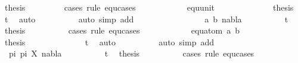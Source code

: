 \begin{isabellebody}
\ {\isacharquery}{\kern0pt}thesis\isanewline
\ \ \ \ \ \ \ \ \isamarkupfalse%
{\isacharparenleft}{\kern0pt}cases\ rule{\isacharcolon}{\kern0pt}\ equ{\isachardot}{\kern0pt}cases{\isacharparenright}{\kern0pt}\isanewline
\ \ \ \ \ \ \ \ \ \ \isamarkupfalse%
\ equ{\isacharunderscore}{\kern0pt}unit\isanewline
\ \ \ \ \ \ \ \ \ \ \isamarkupfalse%
\ \isamarkupfalse%
\ {\isacharquery}{\kern0pt}thesis\ \isamarkupfalse%
\ t{}{}\ \isamarkupfalse%
\ auto\isanewline
\ \ \ \ \ \ \ \ \isamarkupfalse%
\ {\isacharparenleft}{\kern0pt}auto\ simp\ add{\isacharcolon}{\kern0pt}\ {}{\isacharparenright}{\kern0pt}\isanewline
\ \ \ \ \ \isamarkupfalse%
\isanewline
\ \ \ \ \ \ \ \isamarkupfalse%
\ {\isacharparenleft}{\kern0pt}{}\ a\ b\ nabla{\isacharparenright}{\kern0pt}\isanewline
\ \ \ \ \ \ \ \ \isamarkupfalse%
\ t{}{}\ \isamarkupfalse%
\ {\isacharquery}{\kern0pt}thesis\ \isanewline
\ \ \ \ \ \ \ \ \isamarkupfalse%
{\isacharparenleft}{\kern0pt}cases\ rule{\isacharcolon}{\kern0pt}\ equ{\isachardot}{\kern0pt}cases{\isacharparenright}{\kern0pt}\isanewline
\ \ \ \ \ \ \ \ \ \ \isamarkupfalse%
\ {\isacharparenleft}{\kern0pt}equ{\isacharunderscore}{\kern0pt}atom\ a\ b{\isacharparenright}{\kern0pt}\isanewline
\ \ \ \ \ \ \ \ \ \ \isamarkupfalse%
\ \isamarkupfalse%
\ {\isacharquery}{\kern0pt}thesis\isanewline
\ \ \ \ \ \ \ \ \ \ \ \ \isamarkupfalse%
\ t{}{}\ \isamarkupfalse%
\ auto\isanewline
\ \ \ \ \ \ \ \ \isamarkupfalse%
\ {\isacharparenleft}{\kern0pt}auto\ simp\ add{\isacharcolon}{\kern0pt}\ {}{\isacharparenright}{\kern0pt}\isanewline
\ \ \ \ \ \isamarkupfalse%
\isanewline
\ \ \ \ \ \ \ \isamarkupfalse%
\ {\isacharparenleft}{\kern0pt}{}\ pi{}\ pi{}\ X\ nabla{\isacharparenright}{\kern0pt}\isanewline
\ \ \ \ \ \ \ \ \isamarkupfalse%
\ t{}{}\ \isamarkupfalse%
\ {\isacharquery}{\kern0pt}thesis\ \isanewline
\ \ \ \ \ \ \ \ \isamarkupfalse%
{\isacharparenleft}{\kern0pt}cases\ rule{\isacharcolon}{\kern0pt}\ equ{\isachardot}{\kern0pt}cases{\isacharparenright}{\kern0pt}\isanewline

\end{isabellebody}

